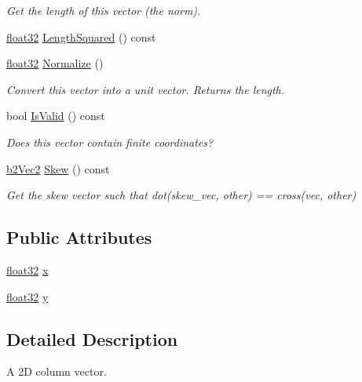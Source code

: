 \begin{DoxyCompactItemize}
\begin{DoxyCompactList}\small\item\em Get the length of this vector (the norm). \end{DoxyCompactList}\item 
\mbox{\hyperlink{b2_settings_8h_aacdc525d6f7bddb3ae95d5c311bd06a1}{float32}} \mbox{\hyperlink{structb2_vec2_af8a081dac7eea7800fdbfbf95ac9e395}{Length\+Squared}} () const
\item 
\mbox{\hyperlink{b2_settings_8h_aacdc525d6f7bddb3ae95d5c311bd06a1}{float32}} \mbox{\hyperlink{structb2_vec2_adda78c92f318fe53d8a53f9b5cfd8e41}{Normalize}} ()
\begin{DoxyCompactList}\small\item\em Convert this vector into a unit vector. Returns the length. \end{DoxyCompactList}\item 
bool \mbox{\hyperlink{structb2_vec2_abad59bf9a0269f02cda9dc919592c0ee}{Is\+Valid}} () const
\begin{DoxyCompactList}\small\item\em Does this vector contain finite coordinates? \end{DoxyCompactList}\item 
\mbox{\hyperlink{structb2_vec2}{b2\+Vec2}} \mbox{\hyperlink{structb2_vec2_aaf36e082a20368b24edb635511872a74}{Skew}} () const
\begin{DoxyCompactList}\small\item\em Get the skew vector such that dot(skew\+\_\+vec, other) == cross(vec, other) \end{DoxyCompactList}\end{DoxyCompactItemize}
\subsection*{Public Attributes}
\begin{DoxyCompactItemize}
\item 
\mbox{\hyperlink{b2_settings_8h_aacdc525d6f7bddb3ae95d5c311bd06a1}{float32}} \mbox{\hyperlink{structb2_vec2_a07021c1c08c547868e3cce9c9ef2ea71}{x}}
\item 
\mbox{\hyperlink{b2_settings_8h_aacdc525d6f7bddb3ae95d5c311bd06a1}{float32}} \mbox{\hyperlink{structb2_vec2_a880f573a9efe402ec207e9d132cb2a43}{y}}
\end{DoxyCompactItemize}


\subsection{Detailed Description}
A 2D column vector. 

